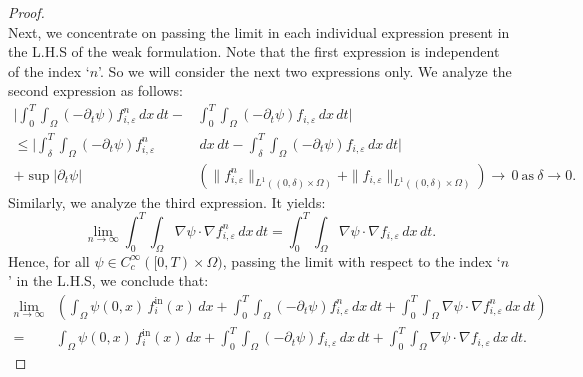 \documentclass[a4paper,12pt,reqno]{amsart}
\theoremstyle{plain}
\numberwithin{equation}{section}
\begin{document}
\begin{proof}
\[		\]
		Next, we concentrate on passing the limit in each individual expression present in the L.H.S of the weak formulation. Note that the first expression is independent of the index `$n$'. So we will consider the next two expressions only. We analyze the second expression as follows:
		\begin{align*}
			\Big|\int_0^T \int_\Omega
			\left(-\partial_t \psi\right) f_{i,\varepsilon}^n
			\,dx\,dt - & \int_0^T \int_\Omega
			\left(-\partial_t \psi\right) f_{i,\varepsilon}
			\,dx\,dt\Big| \\
			\leq \Big| \int_{\delta}^T \int_\Omega
			\left(-\partial_t \psi\right) f_{i,\varepsilon}^n
			& \,dx\,dt - \int_{\delta}^T \int_\Omega
			\left(-\partial_t \psi\right) f_{i,\varepsilon}
			\,dx\,dt\Big| \\
			+\sup |\partial_t \psi| & \left(\| f_{i,\varepsilon}^n\|_{L^1((0,\delta)\times\Omega)}+\| f_{i,\varepsilon}\|_{L^1((0,\delta)\times\Omega)}\right)\to \, 0 \ \text{as}\ \delta\to 0.
		\end{align*}
		Similarly, we analyze the third expression. It yields:
		\[
		\lim_{n\to\infty}\int_0^T \int_\Omega
		\nabla \psi \cdot \nabla f_{i,\varepsilon}^n
		\,dx\,dt= \int_0^T \int_\Omega
		\nabla \psi \cdot \nabla f_{i,\varepsilon}
		\,dx\,dt.
		\]
		Hence, for all $\psi\in C^{\infty}_c([0,T)\times\Omega)$, passing the limit with respect to the index `$n$' in the L.H.S, we conclude that:
		\begin{align*}
			\lim_{n\to\infty}&\left( 
			\int_\Omega
			\psi(0,x)\, f_i^{\mathrm{in}}(x)\, dx
			+
			\int_0^T \int_\Omega
			\left(-\partial_t \psi\right) f_{i,\varepsilon}^n
			\,dx\,dt
			+
			\int_0^T \int_\Omega
			\nabla \psi \cdot \nabla f_{i,\varepsilon}^n
			\,dx\,dt
			\right)\\
			=& \int_\Omega
			\psi(0,x)\, f_i^{\mathrm{in}}(x)\, dx
			+
			\int_0^T \int_\Omega
			\left(-\partial_t \psi\right) f_{i,\varepsilon}
			\,dx\,dt
			+
			\int_0^T \int_\Omega
			\nabla \psi \cdot \nabla f_{i,\varepsilon}
			\,dx\,dt.
		\end{align*}
		\medskip
		

\end{proof}
\end{document}
